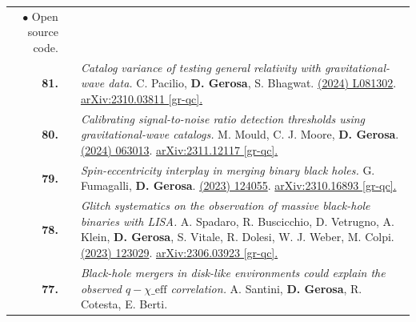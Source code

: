 {\begin{longtable}{rp{0.3cm}p{15.8cm}}
\newline{}
\textcolor{color1}{$\bullet$} Open source code.
\vspace{0.09cm}\\
%
\textbf{81.} & & \textit{Catalog variance of testing general relativity with gravitational-wave data.}
\newline{}
C. Pacilio, \textbf{D. Gerosa}, S. Bhagwat.
\newline{}
\href{https://journals.aps.org/prd/abstract/10.1103/PhysRevD.109.L081302}{\prdl 109 (2024) L081302}. \href{https://arxiv.org/abs/2310.03811}{arXiv:2310.03811 [gr-qc].}
\vspace{0.09cm}\\
%
\textbf{80.} & & \textit{Calibrating signal-to-noise ratio detection thresholds using gravitational-wave catalogs.}
\newline{}
M. Mould, C. J. Moore, \textbf{D. Gerosa}.
\newline{}
\href{https://journals.aps.org/prd/abstract/10.1103/PhysRevD.109.063013}{\prd 109 (2024) 063013}. \href{https://arxiv.org/abs/2311.12117}{arXiv:2311.12117 [gr-qc].}
\vspace{0.09cm}\\
%
\textbf{79.} & & \textit{Spin-eccentricity interplay in merging binary black holes.}
\newline{}
G. Fumagalli, \textbf{D. Gerosa}.
\newline{}
\href{https://journals.aps.org/prd/abstract/10.1103/PhysRevD.108.124055}{\prd 108 (2023) 124055}. \href{https://arxiv.org/abs/2310.16893}{arXiv:2310.16893 [gr-qc].}
\vspace{0.09cm}\\
%
\textbf{78.} & & \textit{Glitch systematics on the observation of massive black-hole binaries with LISA.}
\newline{}
A. Spadaro, R. Buscicchio, D. Vetrugno, A. Klein, \textbf{D. Gerosa}, S. Vitale, R. Dolesi, W. J. Weber, M. Colpi.
\newline{}
\href{https://journals.aps.org/prd/abstract/10.1103/PhysRevD.108.123029}{\prd 108 (2023) 123029}. \href{https://arxiv.org/abs/2306.03923}{arXiv:2306.03923 [gr-qc].}
\vspace{0.09cm}\\
%
\textbf{77.} & & \textit{Black-hole mergers in disk-like environments could explain the observed $q-\chi\_\mathrm{eff}$ correlation.}
\newline{}
A. Santini, \textbf{D. Gerosa}, R. Cotesta, E. Berti.
\newline{}

\end{longtable}}
